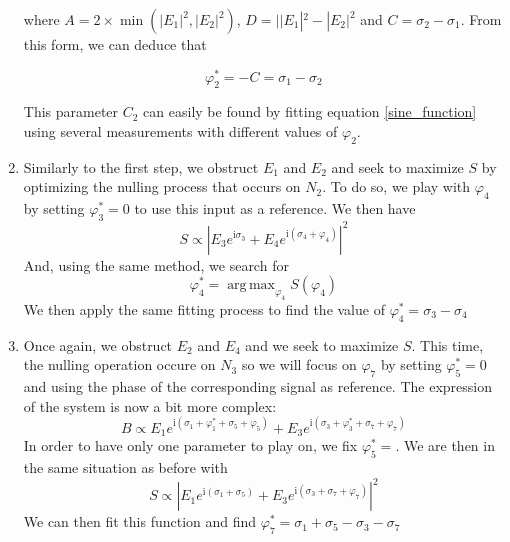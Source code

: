 \documentclass{aa}
\DeclareMathOperator*{\argmax}{arg\,max}
\newcommand{\mi}{\mathrm{i}}
\begin{document}
\begin{enumerate}
                    where $A = 2 \times \min(|E_1|^2, |E_2|^2)$, $D = ||E_1|^2 - |E_2|^2$ and $C = \sigma_2 - \sigma_1$. From this form, we can deduce that
                    
                    \begin{equation}
                        \varphi_2^* = - C = \sigma_1 - \sigma_2
                    \end{equation}
                    
                    This parameter $C_2$ can easily be found by fitting equation \ref{sine_function} using several measurements with different values of $\varphi_2$.
                
                \item Similarly to the first step, we obstruct $E_1$ and $E_2$ and seek to maximize $S$ by optimizing the nulling process that occurs on $N_2$. To do so, we play with $\varphi_4$ by setting $\varphi_3^* = 0$ to use this input as a reference. We then have
                    \begin{equation}
                            S \propto |E_3e^{\mi\sigma_3} + E_4e^{\mi(\sigma_4 + \varphi_4)}|^2
                    \end{equation}
                    And, using the same method, we search for
                    \begin{equation}
                        \varphi_4^* = \argmax_{\varphi_4} S(\varphi_4)
                    \end{equation}
                    We then apply the same fitting process to find the value of $\varphi_4^* = \sigma_3 - \sigma_4$
                    
                \item Once again, we obstruct $E_2$ and $E_4$ and we seek to maximize $S$. This time, the nulling operation occure on $N_3$ so we will focus on $\varphi_7$ by setting $\varphi_5^* = 0$ and using the phase of the corresponding signal as reference. The expression of the system is now a bit more complex: 
                    \begin{equation}
                        B \propto E_1e^{\mi(\sigma_1 + \varphi_1^* + \sigma_5 + \varphi_5)} + E_3e^{\mi(\sigma_3 + \varphi_3^* + \sigma_7 + \varphi_7)}
                    \end{equation}
                    In order to have only one parameter to play on, we fix $\varphi_5^* = $. We are then in the same situation as before with
                    \begin{equation}
                        S \propto |E_1e^{\mi(\sigma_1 + \sigma_5)} + E_3e^{\mi(\sigma_3 + \sigma_7 + \varphi_7)}|^2
                    \end{equation}
                    We can then fit this function and find $\varphi_7^* = \sigma_1 + \sigma_5 - \sigma_3 - \sigma_7$
                    

\end{enumerate}
\end{document}
